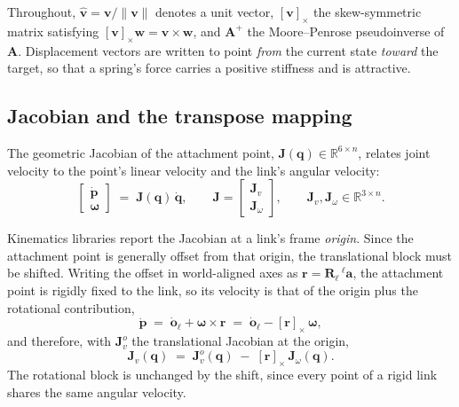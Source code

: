 Throughout, $\hat{\bm{v}} = \bm{v}/\lVert\bm{v}\rVert$ denotes a unit vector,
$[\bm{v}]_{\times}$ the skew-symmetric matrix satisfying
$[\bm{v}]_{\times}\bm{w} = \bm{v}\times\bm{w}$, and $\bm{A}^{+}$ the
Moore--Penrose pseudoinverse of $\bm{A}$. Displacement vectors are written to
point \emph{from} the current state \emph{toward} the target, so that a spring's
force carries a positive stiffness and is attractive.

\subsection{Jacobian and the transpose mapping}
\label{sec:jacobian}

The geometric Jacobian of the attachment point,
$\bm{J}(\bm{q}) \in \mathbb{R}^{6 \times n}$, relates joint velocity to the
point's linear velocity and the link's angular velocity:
%
\begin{equation}
  \begin{bmatrix} \dot{\bm{p}} \\ \bm{\omega} \end{bmatrix}
  \;=\;
  \bm{J}(\bm{q})\,\dot{\bm{q}},
  \qquad
  \bm{J} = \begin{bmatrix} \bm{J}_{v} \\ \bm{J}_{\omega} \end{bmatrix},
  \qquad
  \bm{J}_{v}, \bm{J}_{\omega} \in \mathbb{R}^{3 \times n}.
  \label{eq:jacobian-def}
\end{equation}

Kinematics libraries report the Jacobian at a link's frame \emph{origin}. Since
the attachment point is generally offset from that origin, the translational
block must be shifted. Writing the offset in world-aligned axes as
$\bm{r} = \bm{R}_{\ell}\,{}^{\ell}\bm{a}$, the attachment point is rigidly
fixed to the link, so its velocity is that of the origin plus the rotational
contribution,
%
\begin{equation}
  \dot{\bm{p}} \;=\; \dot{\bm{o}}_{\ell} + \bm{\omega} \times \bm{r}
  \;=\; \dot{\bm{o}}_{\ell} - [\bm{r}]_{\times}\,\bm{\omega},
\end{equation}
%
and therefore, with $\bm{J}_{v}^{o}$ the translational Jacobian at the origin,
%
\begin{equation}
  \boxed{\;\bm{J}_{v}(\bm{q}) \;=\; \bm{J}_{v}^{o}(\bm{q}) \;-\;
  [\bm{r}]_{\times}\,\bm{J}_{\omega}(\bm{q}).\;}
  \label{eq:point-shift}
\end{equation}
%
The rotational block is unchanged by the shift, since every point of a rigid
link shares the same angular velocity.

